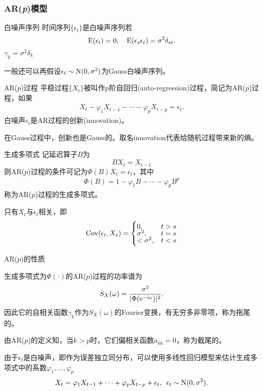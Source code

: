 \subsubsection{AR(\textit{p})模型}
\begin{definition}{白噪声序列}{}
	时间序列$\{\epsilon_t\}$是白噪声序列若
	\[
		\operatorname{E}(\epsilon_t)=0,\quad\operatorname{E}(\epsilon_s\epsilon_t)=\sigma^2\delta_{st}.
	\]
	$\gamma_k=\sigma^2\delta_k$
\end{definition}
一般还可以再假设$\epsilon_t\sim\operatorname{N}(0,\sigma^2)$为Gauss白噪声序列。
\begin{definition}{AR($p$)过程}{}
	平稳过程$\{X_t\}$被叫作p阶自回归(auto-regression)过程，简记为AR($p$)过程，如果
	\begin{align}
		X_t-\varphi_1X_{t-1}-\cdots-\varphi_pX_{t-p}=\epsilon_t.
	\end{align}
	白噪声$\epsilon_t$是AR过程的创新(innovation)。
\end{definition}
在Gauss过程中，创新也是Gauss的。取名innovation代表给随机过程带来新的熵。
\begin{definition}{生成多项式}{}
	记延迟算子$ B $为
	\[
		BX_t=X_{t-1}
	\]
	则AR($p$)过程的条件可记为$\Phi(B)X_t=\epsilon_t$，其中
	\begin{align}
		\Phi(B)=1-\varphi_1B-\cdots-\varphi_pB^p
	\end{align}
	称为AR($p$)过程的生成多项式。
\end{definition}
只有$X_t$与$\epsilon_t$相关，即
\begin{align*}
	\operatorname{Cov}(\epsilon_t,X_s)=\begin{cases}
		0,&t>s\\[-1ex]
		\sigma^2,&t=s\\[-1ex]
		<\sigma^2,&t<s
	\end{cases}
\end{align*}
\begin{theorem}{AR($p$)的性质}{}
	\begin{compactitem}
		\item 生成多项式为$\Phi(\cdot)$的AR($p$)过程的功率谱为
		\[
			S_X(\omega)=\frac{\sigma^2}{|\Phi(\mathop{}\!\mathrm{e}^{-\mathrm{i}\omega})|^2}.
		\]
		因此它的自相关函数$\gamma_k$作为$ S_X(\omega) $的Fourier变换，有无穷多非零项，称为拖尾的。
		\item 由AR($p$)的定义知，当$ k > p $时，它们偏相关函数$ a_{kk} = 0$，称为截尾的。
	\end{compactitem}
\end{theorem}
由于$\epsilon_t$是白噪声，即作为误差独立同分布，可以使用多线性回归模型来估计生成多项式中的系数$\varphi_1,\ldots,\varphi_p$
\[
	X_t=\varphi_1X_{t-1}+\cdots+\varphi_pX_{t-p}+\epsilon_t,\enspace\epsilon_t\sim\operatorname{N}(0,\sigma^2).
\]
